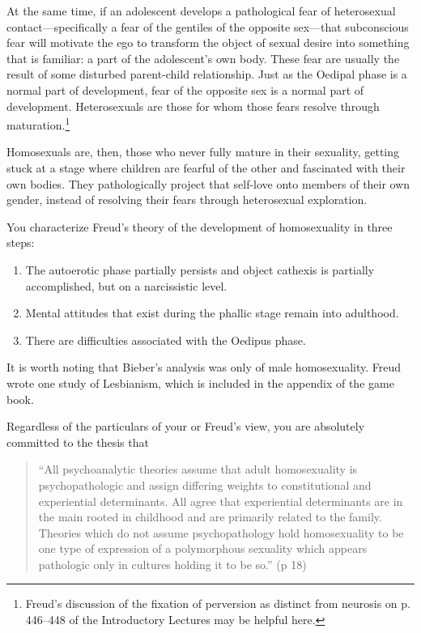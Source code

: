 At the same time, if an adolescent develops a pathological fear of heterosexual contact---specifically a fear of the gentiles of the opposite sex---that subconscious fear will motivate the ego to transform the object of sexual desire into something that is familiar: a part of the adolescent's own body. These fear are usually the result of some disturbed parent-child relationship. Just as the Oedipal phase is a normal part of development, fear of the opposite sex is a normal part of development. Heterosexuals are those for whom those fears resolve through maturation.\footnote{Freud's discussion of the fixation of perversion as distinct from neurosis on p. 446--448 of the Introductory Lectures may be helpful here.}

Homosexuals are, then, those who never fully mature in their sexuality, getting stuck at a stage where children are fearful of the other and fascinated with their own bodies. They pathologically project that self-love onto members of their own gender, instead of resolving their fears through heterosexual exploration.

You characterize Freud's theory of the development of homosexuality in three steps:

\begin{enumerate}
\item The autoerotic phase partially persists and object cathexis is partially accomplished, but on a narcissistic level.

\item Mental attitudes that exist during the phallic stage remain into adulthood.

\item There are difficulties associated with the Oedipus phase.

\end{enumerate}

It is worth noting that Bieber's analysis was only of male homosexuality. Freud wrote one study of Lesbianism, which is included in the appendix of the game book.

Regardless of the particulars of your or Freud's view, you are absolutely committed to the thesis that

\begin{quote}

``All psychoanalytic theories assume that adult homosexuality is psychopathologic and assign differing weights to constitutional and experiential determinants. All agree that experiential determinants are in the main rooted in childhood and are primarily related to the family. Theories which do not assume psychopathology hold homosexuality to be one type of expression of a polymorphous sexuality which appears pathologic only in cultures holding it to be so.'' (p 18)
\end{quote}

